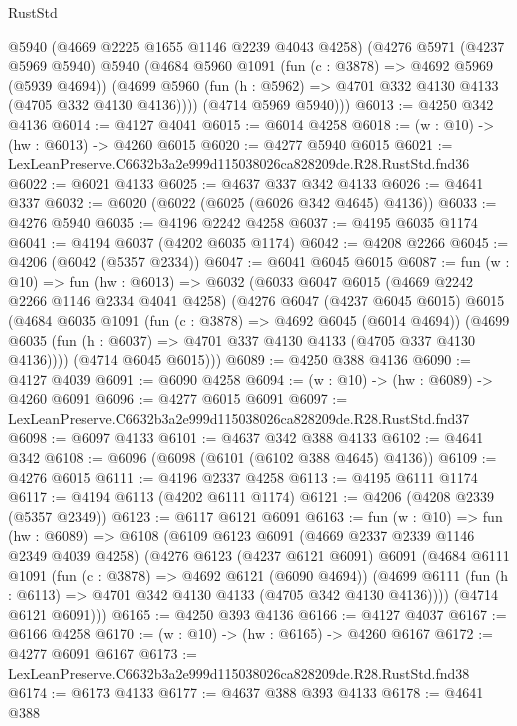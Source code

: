 \begin{lexlean}{RustStd}
\begin{coremodule}
      @5940
      (@4669 @2225 @1655 @1146 @2239 @4043 @4258)
      (@4276
        @5971
        (@4237 @5969 @5940)
        @5940
        (@4684
          @5960
          @1091
          (fun (c : @3878) => @4692 @5969 (@5939 @4694))
          (@4699 @5960 (fun (h : @5962) => @4701 @332 @4130 @4133 (@4705 @332 @4130 @4136))))
        (@4714 @5969 @5940)))
@6013 := @4250 @342 @4136
@6014 := @4127 @4041
@6015 := @6014 @4258
@6018 := (w : @10) -> (hw : @6013) -> @4260 @6015
@6020 := @4277 @5940 @6015
@6021 := LexLeanPreserve.C6632b3a2e999d115038026ca828209de.R28.RustStd.fnd36
@6022 := @6021 @4133
@6025 := @4637 @337 @342 @4133
@6026 := @4641 @337
@6032 := @6020 (@6022 (@6025 (@6026 @342 @4645) @4136))
@6033 := @4276 @5940
@6035 := @4196 @2242 @4258
@6037 := @4195 @6035 @1174
@6041 := @4194 @6037 (@4202 @6035 @1174)
@6042 := @4208 @2266
@6045 := @4206 (@6042 (@5357 @2334))
@6047 := @6041 @6045 @6015
@6087 := fun (w : @10) =>
  fun (hw : @6013) =>
  @6032
    (@6033
      @6047
      @6015
      (@4669 @2242 @2266 @1146 @2334 @4041 @4258)
      (@4276
        @6047
        (@4237 @6045 @6015)
        @6015
        (@4684
          @6035
          @1091
          (fun (c : @3878) => @4692 @6045 (@6014 @4694))
          (@4699 @6035 (fun (h : @6037) => @4701 @337 @4130 @4133 (@4705 @337 @4130 @4136))))
        (@4714 @6045 @6015)))
@6089 := @4250 @388 @4136
@6090 := @4127 @4039
@6091 := @6090 @4258
@6094 := (w : @10) -> (hw : @6089) -> @4260 @6091
@6096 := @4277 @6015 @6091
@6097 := LexLeanPreserve.C6632b3a2e999d115038026ca828209de.R28.RustStd.fnd37
@6098 := @6097 @4133
@6101 := @4637 @342 @388 @4133
@6102 := @4641 @342
@6108 := @6096 (@6098 (@6101 (@6102 @388 @4645) @4136))
@6109 := @4276 @6015
@6111 := @4196 @2337 @4258
@6113 := @4195 @6111 @1174
@6117 := @4194 @6113 (@4202 @6111 @1174)
@6121 := @4206 (@4208 @2339 (@5357 @2349))
@6123 := @6117 @6121 @6091
@6163 := fun (w : @10) =>
  fun (hw : @6089) =>
  @6108
    (@6109
      @6123
      @6091
      (@4669 @2337 @2339 @1146 @2349 @4039 @4258)
      (@4276
        @6123
        (@4237 @6121 @6091)
        @6091
        (@4684
          @6111
          @1091
          (fun (c : @3878) => @4692 @6121 (@6090 @4694))
          (@4699 @6111 (fun (h : @6113) => @4701 @342 @4130 @4133 (@4705 @342 @4130 @4136))))
        (@4714 @6121 @6091)))
@6165 := @4250 @393 @4136
@6166 := @4127 @4037
@6167 := @6166 @4258
@6170 := (w : @10) -> (hw : @6165) -> @4260 @6167
@6172 := @4277 @6091 @6167
@6173 := LexLeanPreserve.C6632b3a2e999d115038026ca828209de.R28.RustStd.fnd38
@6174 := @6173 @4133
@6177 := @4637 @388 @393 @4133
@6178 := @4641 @388

\end{coremodule}
\end{lexlean}

